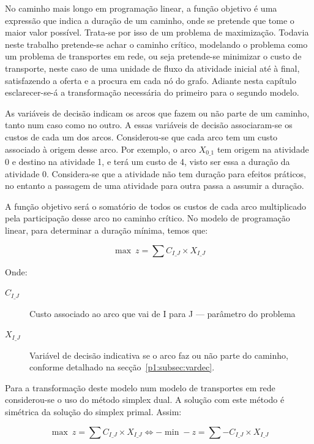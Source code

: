 No caminho mais longo em programação linear, a função objetivo é  uma expressão
que indica a duração de um caminho, onde se pretende que tome o maior valor
possível. Trata-se por isso de um problema de maximização.  Todavia neste
trabalho pretende-se achar o caminho crítico, modelando o problema como um
problema de transportes em rede, ou seja pretende-se minimizar o custo de
transporte, neste caso de uma unidade de fluxo da atividade inicial até à final,
satisfazendo a oferta e a procura em cada nó do grafo. Adiante nesta capítulo
esclarecer-se-á a transformação necessária do primeiro para o segundo modelo.

As variáveis de decisão indicam os arcos que fazem ou não parte de um caminho,
tanto num caso como no outro. A essas variáveis de decisão associaram-se os
custos de cada um dos arcos. Considerou-se que cada arco tem um custo associado
à origem desse arco. Por exemplo, o arco $X_{0\_1}$ tem origem na atividade
0 e destino na atividade 1, e terá um custo de 4, visto ser essa a duração da
atividade 0. Considera-se que a atividade não tem duração para efeitos práticos,
no entanto a passagem de uma atividade para outra passa a assumir a duração.


A função objetivo será o somatório de todos os custos de cada arco multiplicado
pela participação desse arco no caminho crítico. No modelo de programação
linear, para determinar a duração mínima, temos que:

\begin{displaymath}
\max~z = \sum  C_{I\_J} \times X_{I\_J}
\end{displaymath}

Onde:
\begin{description}
	\item[$C_{I\_J}$] Custo associado ao arco que vai de I para J --- parâmetro do problema
	\item[$X_{I\_J}$] Variável de decisão indicativa se o arco faz ou não parte do
	caminho, conforme detalhado na secção~\ref{p1:subsec:vardec}.
\end{description}

Para a transformação deste modelo num modelo de transportes em rede
considerou-se o uso do método simplex dual. A solução com este método
é simétrica da solução do simplex primal. Assim: 

\begin{displaymath}
	\max~z = \sum  C_{I\_J} \times X_{I\_J} \Leftrightarrow - \min -z = \sum
	- C_{I\_J} \times X_{I\_J}
\end{displaymath}




